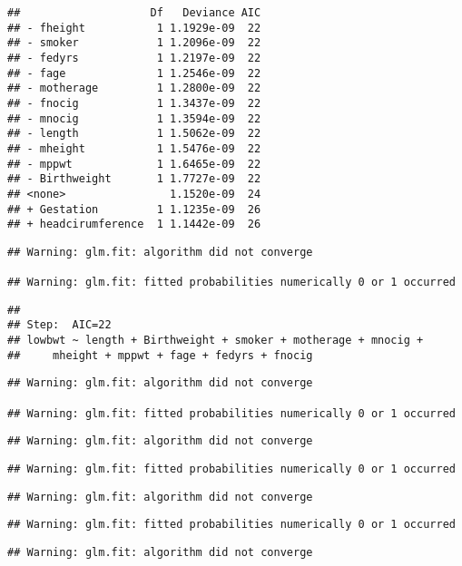 \documentclass[]{article}
\begin{document}
\begin{verbatim}
##                    Df   Deviance AIC
## - fheight           1 1.1929e-09  22
## - smoker            1 1.2096e-09  22
## - fedyrs            1 1.2197e-09  22
## - fage              1 1.2546e-09  22
## - motherage         1 1.2800e-09  22
## - fnocig            1 1.3437e-09  22
## - mnocig            1 1.3594e-09  22
## - length            1 1.5062e-09  22
## - mheight           1 1.5476e-09  22
## - mppwt             1 1.6465e-09  22
## - Birthweight       1 1.7727e-09  22
## <none>                1.1520e-09  24
## + Gestation         1 1.1235e-09  26
## + headcirumference  1 1.1442e-09  26
\end{verbatim}

\begin{verbatim}
## Warning: glm.fit: algorithm did not converge

## Warning: glm.fit: fitted probabilities numerically 0 or 1 occurred
\end{verbatim}

\begin{verbatim}
## 
## Step:  AIC=22
## lowbwt ~ length + Birthweight + smoker + motherage + mnocig + 
##     mheight + mppwt + fage + fedyrs + fnocig
\end{verbatim}

\begin{verbatim}
## Warning: glm.fit: algorithm did not converge

## Warning: glm.fit: fitted probabilities numerically 0 or 1 occurred
\end{verbatim}

\begin{verbatim}
## Warning: glm.fit: algorithm did not converge
\end{verbatim}

\begin{verbatim}
## Warning: glm.fit: fitted probabilities numerically 0 or 1 occurred
\end{verbatim}

\begin{verbatim}
## Warning: glm.fit: algorithm did not converge
\end{verbatim}

\begin{verbatim}
## Warning: glm.fit: fitted probabilities numerically 0 or 1 occurred
\end{verbatim}

\begin{verbatim}
## Warning: glm.fit: algorithm did not converge
\end{verbatim}
\end{document}
